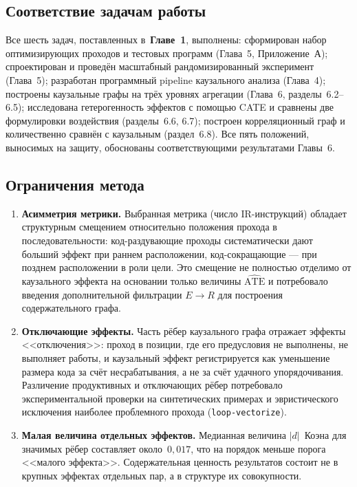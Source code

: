 \subsection*{Соответствие задачам работы}

Все шесть задач, поставленных в~\textbf{Главе~1}, выполнены: сформирован набор оптимизирующих проходов и тестовых программ (Глава~5, Приложение~А); спроектирован и проведён масштабный рандомизированный эксперимент (Глава~5); разработан программный pipeline каузального анализа (Глава~4); построены каузальные графы на трёх уровнях агрегации (Глава~6, разделы~6.2--6.5); исследована гетерогенность эффектов с помощью CATE и сравнены две формулировки воздействия (разделы~6.6, 6.7); построен корреляционный граф и количественно сравнён с каузальным (раздел~6.8). Все пять положений, выносимых на защиту, обоснованы соответствующими результатами Главы~6.

\subsection*{Ограничения метода}

\begin{enumerate}
    \item \textbf{Асимметрия метрики.} Выбранная метрика (число IR-инструкций) обладает структурным смещением относительно положения прохода в последовательности: код-раздувающие проходы систематически дают больший эффект при раннем расположении, код-сокращающие --- при позднем расположении в роли цели. Это смещение не полностью отделимо от каузального эффекта на основании только величины $\widehat{\text{ATE}}$ и потребовало введения дополнительной фильтрации $E \to R$ для построения содержательного графа.

    \item \textbf{Отключающие эффекты.} Часть рёбер каузального графа отражает эффекты <<отключения>>: проход в позиции, где его предусловия не выполнены, не выполняет работы, и каузальный эффект регистрируется как уменьшение размера кода за счёт несрабатывания, а не за счёт удачного упорядочивания. Различение продуктивных и отключающих рёбер потребовало экспериментальной проверки на синтетических примерах и эвристического исключения наиболее проблемного прохода (\texttt{loop-vectorize}).

    \item \textbf{Малая величина отдельных эффектов.} Медианная величина $|d|$~Коэна для значимых рёбер составляет около~$0{,}017$, что на порядок меньше порога <<малого эффекта>>. Содержательная ценность результатов состоит не в крупных эффектах отдельных пар, а в структуре их совокупности.
\end{enumerate}

